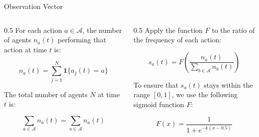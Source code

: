 \begin{frame}{Observation Vector}
\vspace{-15mm}
\begin{columns}[T] %

\begin{column}{0.5\textwidth}
For each action \( a \in \mathcal{A} \), the number of agents \( n_a(t) \) performing that action at time \( t \) is:

\[
n_a(t) = \sum_{j=1}^{N} \mathbf{1}\{a_j(t) = a\}
\]


The total number of agents \( N \) at time \( t \) is:

\[
\sum_{a \in \mathcal{A}} n_a(t) = \sum_{a \in \mathcal{A}} n_a(t)
\]
\end{column}

\begin{column}{0.5\textwidth}
Apply the function \( F \) to the ratio of the frequency of each action:

\[
s_a(t) = F\left( \frac{n_a(t)}{\sum_{b \in \mathcal{A}} n_b(t)} \right)
\]


To ensure that \( s_a(t) \) stays within the range \([0, 1]\), we use the following sigmoid function \( F \):

\[
F(x) = \frac{1}{1 + e^{-k(x - 0.5)}}
\]
\end{column}

\end{columns}

\end{frame}

